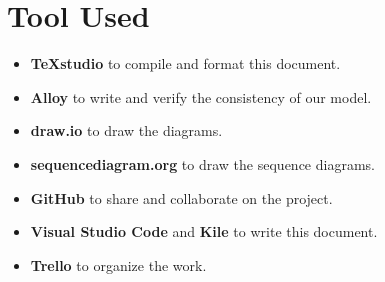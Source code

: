 \section*{Tool Used}
\label{s:Tool_Used}%

\begin{itemize}
  \item \textbf{TeXstudio} to compile and format this document.
  \item \textbf{Alloy} to write and verify the consistency of our model.
  \item \textbf{draw.io} to draw the diagrams.
  \item \textbf{sequencediagram.org} to draw the sequence diagrams.
  \item \textbf{GitHub} to share and collaborate on the project.
  \item \textbf{Visual Studio Code} and \textbf{Kile} to write this document.
  \item \textbf{Trello} to organize the work.
\end{itemize}
